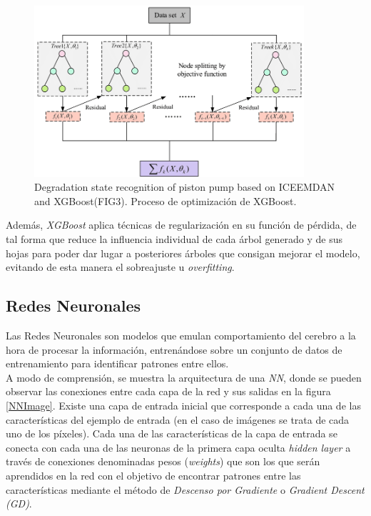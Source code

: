             \begin{figure}[h]
                \centering
                \includegraphics[width=10cm]{archivos/XGBoostFlowImage}
                \caption{Degradation state recognition of piston pump based on ICEEMDAN and XGBoost(FIG3). Proceso de optimización de XGBoost.}
                \label{XGBoostFlowImage}
             \end{figure}

            
            Además, \textit{XGBoost} aplica técnicas de regularización en su función de pérdida, de tal forma que reduce la influencia individual de cada árbol generado y de sus hojas para poder dar lugar a posteriores árboles que consigan mejorar el modelo, evitando de esta manera el sobreajuste u \textit{overfitting}.



        \subsection {Redes Neuronales}

            Las Redes Neuronales \cite{NNReview} son modelos que emulan comportamiento del cerebro a la hora de procesar la información, entrenándose sobre un conjunto de datos de entrenamiento para identificar patrones entre ellos.\\

            A modo de comprensión, se muestra la arquitectura de una \textit{NN}, donde se pueden observar las conexiones entre cada capa de la red y sus salidas en la figura \ref{NNImage}. Existe una capa de entrada inicial que corresponde a cada una de las características del ejemplo de entrada (en el caso de imágenes se trata de cada uno de los píxeles). Cada una de las características de la capa de entrada se conecta con cada una de las neuronas de la primera capa oculta \textit{hidden layer} a través de conexiones denominadas pesos (\textit{weights}) que son los que serán aprendidos en la red con el objetivo de encontrar patrones entre las características mediante el método de \textit{Descenso por Gradiente} o \textit{Gradient Descent (GD)}.\\


